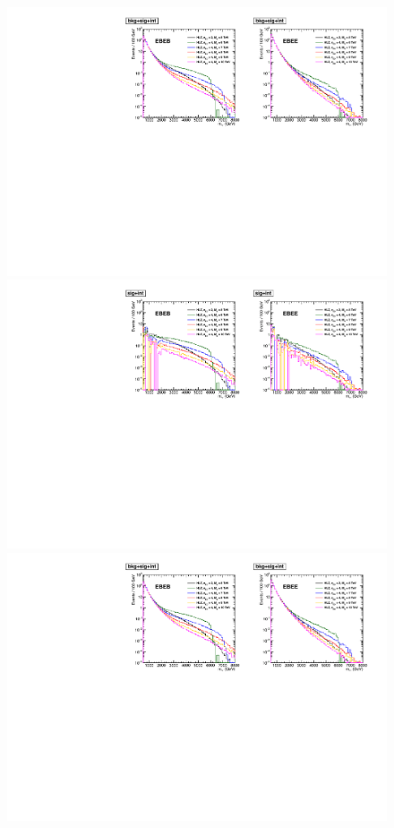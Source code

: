 \begin{figure}[tbp!]
  \centering
  \includegraphics[scale=0.82]{figures/HLZ_sig_int_bkg_left.pdf}
  \includegraphics[scale=0.82]{figures/HLZ_sig_int_right.pdf}
  \includegraphics[scale=0.82]{figures/HLZ_sig_int_bkg_right.pdf}

\end{figure}
